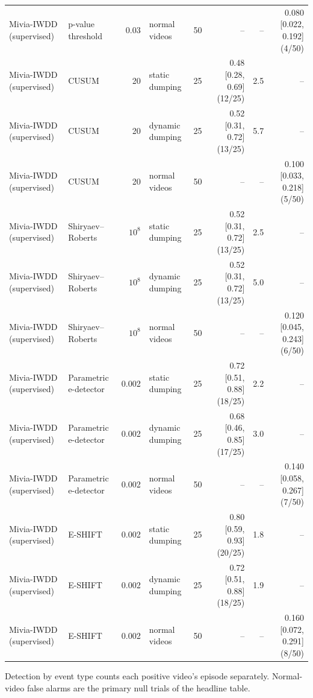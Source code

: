 \begin{table}[t]
{\begin{tabular}{llrlrrrr}
Mivia-IWDD (supervised) & p-value threshold & 0.03 & normal videos & 50 & -- & -- & 0.080 [0.022, 0.192] (4/50) \\
Mivia-IWDD (supervised) & CUSUM & 20 & static dumping & 25 & 0.48 [0.28, 0.69] (12/25) & 2.5 & -- \\
Mivia-IWDD (supervised) & CUSUM & 20 & dynamic dumping & 25 & 0.52 [0.31, 0.72] (13/25) & 5.7 & -- \\
Mivia-IWDD (supervised) & CUSUM & 20 & normal videos & 50 & -- & -- & 0.100 [0.033, 0.218] (5/50) \\
Mivia-IWDD (supervised) & Shiryaev--Roberts & $10^{8}$ & static dumping & 25 & 0.52 [0.31, 0.72] (13/25) & 2.5 & -- \\
Mivia-IWDD (supervised) & Shiryaev--Roberts & $10^{8}$ & dynamic dumping & 25 & 0.52 [0.31, 0.72] (13/25) & 5.0 & -- \\
Mivia-IWDD (supervised) & Shiryaev--Roberts & $10^{8}$ & normal videos & 50 & -- & -- & 0.120 [0.045, 0.243] (6/50) \\
Mivia-IWDD (supervised) & Parametric e-detector & 0.002 & static dumping & 25 & 0.72 [0.51, 0.88] (18/25) & 2.2 & -- \\
Mivia-IWDD (supervised) & Parametric e-detector & 0.002 & dynamic dumping & 25 & 0.68 [0.46, 0.85] (17/25) & 3.0 & -- \\
Mivia-IWDD (supervised) & Parametric e-detector & 0.002 & normal videos & 50 & -- & -- & 0.140 [0.058, 0.267] (7/50) \\
Mivia-IWDD (supervised) & E-SHIFT & 0.002 & static dumping & 25 & 0.80 [0.59, 0.93] (20/25) & 1.8 & -- \\
Mivia-IWDD (supervised) & E-SHIFT & 0.002 & dynamic dumping & 25 & 0.72 [0.51, 0.88] (18/25) & 1.9 & -- \\
Mivia-IWDD (supervised) & E-SHIFT & 0.002 & normal videos & 50 & -- & -- & 0.160 [0.072, 0.291] (8/50) \\
\bottomrule
\end{tabular}}
\begin{minipage}{\linewidth}\vspace{2pt}\footnotesize Detection by event type counts each positive video's episode separately. Normal-video false alarms are the primary null trials of the headline table.\end{minipage}
\end{table}
